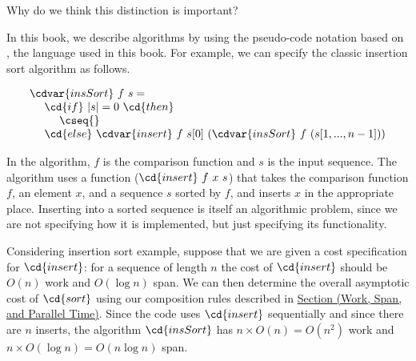 \begin{cluster}
\label{grp:tch:introduction::spec::think}

\begin{teachnote}
\label{tch:introduction::spec::think}
Why do we think this distinction is important?

\end{teachnote}
\end{cluster}

\begin{cluster}
\label{grp:xmpl:introduction::spec::insertion-sort}

\begin{example}
\label{xmpl:introduction::spec::insertion-sort}
In this book, we describe algorithms by using the pseudo-code notation based on \pml{}, the language used in this book.
For example, we can specify the classic insertion sort algorithm as
follows.

\[
\begin{array}{l}
\cdvar{insSort}~f~s =
\\ 
~~~~\cd{if}~|s| = 0~\cd{then} 
\\
~~~~~~~~\cseq{}
\\
~~~~\cd{else}~\cdvar{insert}~f~s[0]~(\cdvar{insSort}~f~(s[1,...,n-1]))
\end{array}
\]


In the algorithm, $f$ is the comparison function and $s$ is the input
sequence.  The algorithm uses a function ($\cd{insert}~f~x~s$) that takes the comparison function $f$, an element $x$, and a sequence $s$ sorted by $f$, and inserts $x$ in the appropriate place.  
Inserting into a sorted sequence is itself an algorithmic problem, since we are not specifying how it is implemented, but just specifying its functionality.  

\end{example}
\end{cluster}

\begin{cluster}
\label{grp:xmpl:introduction::spec::cost-of-insertion-sort}

\begin{example}
\label{xmpl:introduction::spec::cost-of-insertion-sort}
Considering insertion sort example, suppose that we are given a cost specification for $\cd{insert}$: for a sequence of length $n$ the cost of $\cd{insert}$ should be $O(n)$ work and $O(\log n)$ span.
We can then determine the overall asymptotic cost of $\cd{sort}$ using our composition rules described in 
\href{sec:introduction::parallelism::work-span}
{Section (Work, Span, and Parallel Time)}.
Since the code uses $\cd{insert}$ sequentially and since there are $n$ inserts, the algorithm $\cd{insSort}$ has $n \times O(n) = O(n^2)$ work and $n \times O(\log n) = O(n \log n)$ span.

\end{example}
\end{cluster}

